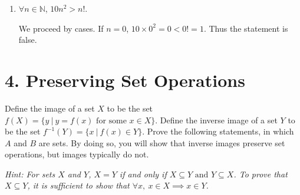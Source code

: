 \documentclass{article}\usepackage{amsmath,amssymb,amsthm,tikz,tkz-graph,color,chngpage,soul,hyperref,csquotes,graphicx,floatrow, yfonts}\newcommand*{\QEDB}{\hfill\ensuremath{\square}}\newtheorem*{prop}{Proposition}\renewcommand{\theenumi}{\alph{enumi}}\usepackage[shortlabels]{enumitem}\usepackage[nobreak=true, framemethod=tikz]{mdframed}\usetikzlibrary{matrix,calc, automata, positioning}\MakeOuterQuote{"}\usepackage[margin=1in]{geometry} \newtheorem{theorem}{Theorem}
\begin{document}
\begin{enumerate}
  \item $\forall n \in \mathbb{N}$, $10n^2 > n!$.
  \begin{mdframed}
  We proceed by cases.
  If $n = 0$, $10 \times 0^2  = 0 < 0! = 1$. Thus the statement is false.
  \end{mdframed}

\end{enumerate}

\pagebreak

\section*{4. Preserving Set Operations}
Define the image of a set $X$ to be the set $f(X) = \{y~|~y = f(x) \text{ for some } x \in X\}$. Define the inverse image of a set $Y$ to be the set $f^{-1}(Y) = \{x~|~f(x) \in Y\}$. Prove the following statements, in which $A$ and $B$ are sets. By doing so, you will show that inverse images preserve set operations, but images typically do not.

\textit{Hint: For sets $X$ and $Y$, $X=Y$ if and only if $X \subseteq Y \text{ and } Y \subseteq X$. To prove that $X \subseteq Y$, it is sufficient to show that $\forall x,~x \in X \implies x \in Y$.}
\end{document}
